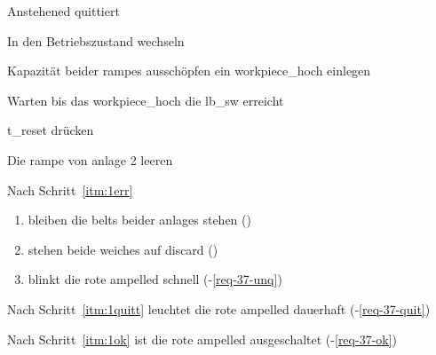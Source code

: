 \label{abntest-fehlerumgang}

\begin{ablauf}{Anstehened quittiert}
    \item In den Betriebszustand wechseln
    \item Kapazität beider \glspl{rampe} ausschöpfen ein \gls{workpiece_hoch} einlegen
    \item \label{itm:1err} Warten bis das \gls{workpiece_hoch} die \gls{lb_sw} erreicht
    \item\label{itm:1quitt} \gls{t_reset} drücken
    \item\label{itm:1ok} Die \gls{rampe} von \gls{anlage} 2 leeren
\end{ablauf}
\begin{erwartung}
    \item Nach Schritt~\ref{itm:1err}
    \begin{enumerate}
        \item bleiben die \glspl{belt} beider \glspl{anlage} stehen ()
        \item stehen beide \glspl{weiche} auf \gls{discard} ()
        \item blinkt die rote \gls{ampelled} schnell (-\ref{req-37-unq})
    \end{enumerate}
    \item Nach Schritt~\ref{itm:1quitt} leuchtet die rote \gls{ampelled} dauerhaft (-\ref{req-37-quit})
    \item Nach Schritt~\ref{itm:1ok} ist die rote \gls{ampelled} ausgeschaltet (-\ref{req-37-ok})
\end{erwartung}

